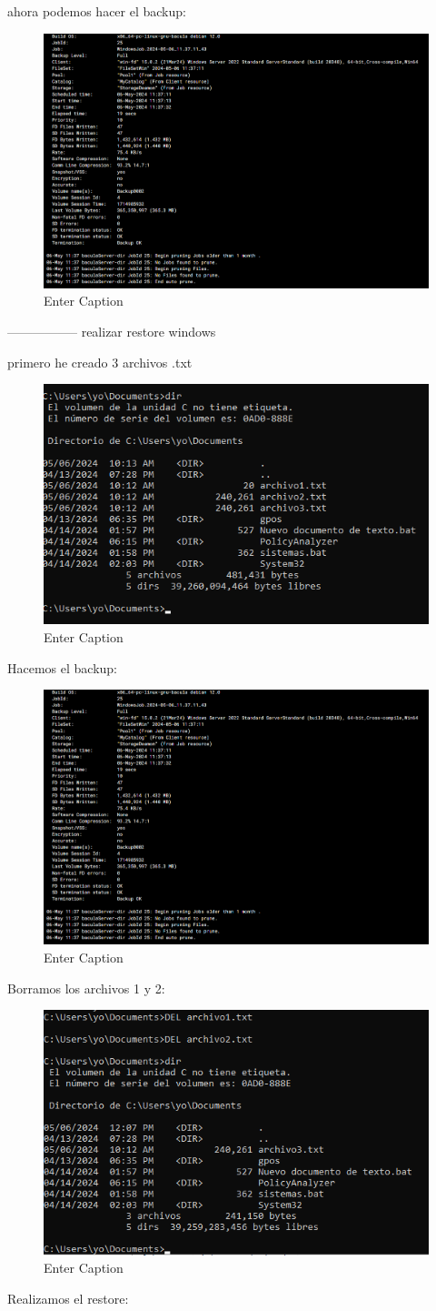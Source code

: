  
ahora podemos hacer el backup:
\begin{figure}[H]
    \centering
    \includegraphics[width=0.5\linewidth]{instalacionBacula/backupWindows.png}
    \caption{Enter Caption}
\end{figure}


-----------------
realizar restore windows


primero he creado 3 archivos .txt
\begin{figure}[H]
    \centering
    \includegraphics[width=0.5\linewidth]{instalacionBacula/archivosWin.png}
    \caption{Enter Caption}
\end{figure}

Hacemos el backup:

\begin{figure}[H]
    \centering
    \includegraphics[width=0.5\linewidth]{instalacionBacula/backupWindows.png}
    \caption{Enter Caption}
\end{figure}

Borramos los archivos 1 y 2:
\begin{figure}[H]
    \centering
    \includegraphics[width=0.5\linewidth]{instalacionBacula/borrarArchivosWin.png}
    \caption{Enter Caption}
\end{figure}
Realizamos el restore:

